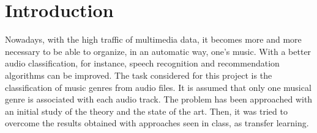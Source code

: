 \section{Introduction}
Nowadays, with the high traffic of multimedia data, it becomes more and more 
necessary to be able to organize, in an automatic way, one's music. 
With a better audio classification, for instance, speech recognition and recommendation algorithms can be improved.
The task considered for this project is the classification of music 
genres from audio files.
It is assumed that only one musical genre is associated with each audio track. 
The problem has been approached with an initial study of the theory and the state of the art. 
Then, it was tried to overcome the results obtained with approaches seen in class, as transfer learning.
